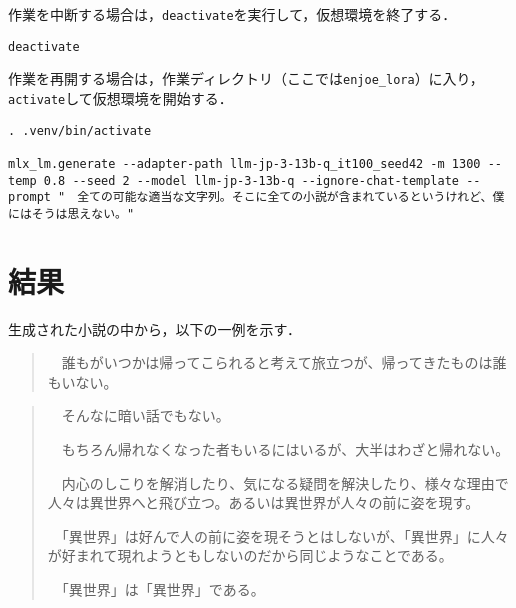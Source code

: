 \documentclass[10pt, a5paper, twoside]{jsarticle}
\theoremstyle{definition}
\begin{document}
		作業を中断する場合は，\texttt{deactivate}を実行して，仮想環境を終了する．

		\begin{mdframed}
			\begin{verbatim}
deactivate
			\end{verbatim}
		\end{mdframed}

		作業を再開する場合は，作業ディレクトリ（ここでは\texttt{enjoe\_lora}）に入り，\texttt{activate}して仮想環境を開始する．

		\begin{mdframed}
			\begin{verbatim}
. .venv/bin/activate

mlx_lm.generate --adapter-path llm-jp-3-13b-q_it100_seed42 -m 1300 --temp 0.8 --seed 2 --model llm-jp-3-13b-q --ignore-chat-template --prompt "　全ての可能な適当な文字列。そこに全ての小説が含まれているというけれど、僕にはそうは思えない。"
			\end{verbatim}
		\end{mdframed}

	\clearpage

	\section{結果}

		生成された小説の中から，以下の一例を示す．

		\begin{quote}
			　誰もがいつかは帰ってこられると考えて旅立つが、帰ってきたものは誰もいない。
		\end{quote}
			
		\begin{quote}
			　そんなに暗い話でもない。

			　もちろん帰れなくなった者もいるにはいるが、大半はわざと帰れない。

			　内心のしこりを解消したり、気になる疑問を解決したり、様々な理由で人々は異世界へと飛び立つ。あるいは異世界が人々の前に姿を現す。

			　「異世界」は好んで人の前に姿を現そうとはしないが、「異世界」に人々が好まれて現れようともしないのだから同じようなことである。

			　「異世界」は「異世界」である。
		\end{quote}
\end{document}
